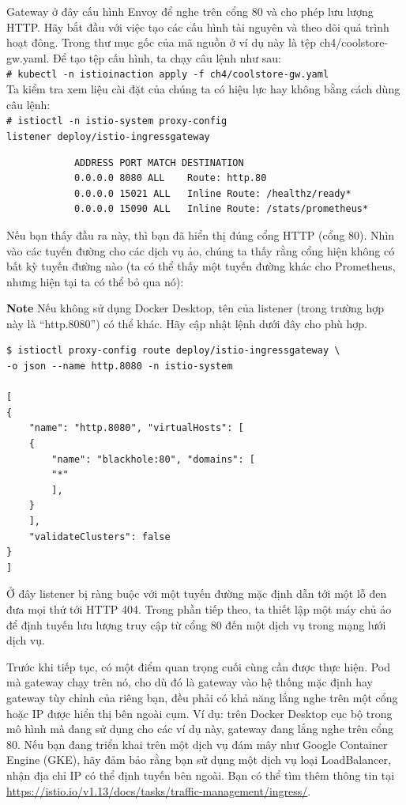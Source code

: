 \documentclass[12pt,a4paper]{report}
\newcommand{\shellcmd}[1]{\\\indent\indent\texttt{\footnotesize\# #1}\\}
\begin{document}
		Gateway ở đây cấu hình Envoy để nghe trên cổng 80 và cho phép lưu lượng HTTP. Hãy bắt đầu với việc tạo các cấu hình tài nguyên và theo dõi quá trình hoạt đông. Trong thư mục gốc của mã nguồn ở ví dụ này là tệp ch4/coolstore-gw.yaml. Để tạo tệp cấu hình, ta chạy câu lệnh như sau:
		\shellcmd{kubectl -n istioinaction apply -f ch4/coolstore-gw.yaml}
		\newpage
		Ta kiểm tra xem liệu cài đặt của chúng ta có hiệu lực hay không bằng cách dùng câu lệnh:
		\shellcmd{istioctl -n istio-system proxy-config \ \\ listener deploy/istio-ingressgateway}
		
		\begin{verbatim}
			ADDRESS PORT MATCH DESTINATION
			0.0.0.0 8080 ALL	Route: http.80
			0.0.0.0 15021 ALL	Inline Route: /healthz/ready*
			0.0.0.0 15090 ALL	Inline Route: /stats/prometheus*
		\end{verbatim}
	
		Nếu bạn thấy đầu ra này, thì bạn đã hiển thị đúng cổng HTTP (cổng 80). Nhìn vào các tuyến đường cho các dịch vụ ảo, chúng ta thấy rằng cổng hiện không có bất kỳ tuyến đường nào (ta có thể thấy một tuyến đường khác cho Prometheus, nhưng hiện tại ta có thể bỏ qua nó):
		
		\textbf{\color{blue}Note }Nếu không sử dụng Docker Desktop, tên của listener (trong trường hợp này là “http.8080”) có thể khác. Hãy cập nhật lệnh dưới đây cho phù hợp.
		
\begin{lstlisting}
$ istioctl proxy-config route deploy/istio-ingressgateway \
-o json --name http.8080 -n istio-system

[
{
	"name": "http.8080", "virtualHosts": [
	{
		"name": "blackhole:80", "domains": [
		"*"
		],
	}
	],
	"validateClusters": false
}
]		
\end{lstlisting}

Ở đây listener bị ràng buộc với một tuyến đường mặc định dẫn tới một lỗ đen đưa mọi thứ tới HTTP 404. Trong phần tiếp theo, ta thiết lập một máy chủ ảo để định tuyến lưu lượng truy cập từ cổng 80 đến một dịch vụ trong mạng lưới dịch vụ.

Trước khi tiếp tục, có một điểm quan trọng cuối cùng cần được thực hiện. Pod mà gateway chạy trên nó, cho dù đó là gateway vào hệ thống mặc định hay gateway tùy chỉnh của riêng bạn, đều phải có khả năng lắng nghe trên một cổng hoặc IP được hiển thị bên ngoài cụm. Ví dụ: trên Docker Desktop cục bộ trong mô hình mà đang sử dụng cho các ví dụ này, gateway đang lắng nghe trên cổng 80. Nếu bạn đang triển khai trên một dịch vụ đám mây như Google Container Engine (GKE), hãy đảm bảo rằng bạn sử dụng một dịch vụ loại LoadBalancer, nhận địa chỉ IP có thể định tuyến bên ngoài. Bạn có thể tìm thêm thông tin tại \url{https://istio.io/v1.13/docs/tasks/traffic-management/ingress/}.
\end{document}
